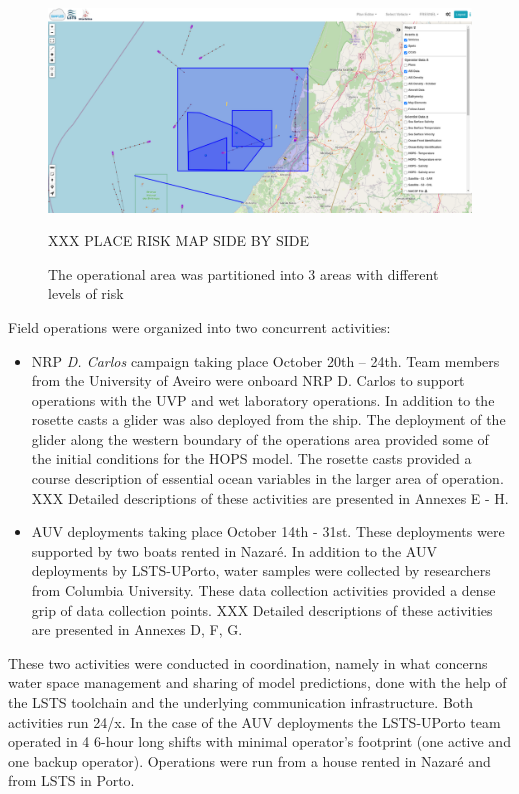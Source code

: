 \begin{figure}
    \centering
    \includegraphics[width=.7\linewidth]{fig/riskareas.png}
    \caption{The operational area was partitioned into 3 areas with
      different levels of risk} XXX PLACE RISK MAP SIDE BY SIDE
    \label{fig:riskareas}
\end{figure}

Field operations were organized into two concurrent activities:

\begin{itemize}
\item NRP \emph{D. Carlos} campaign taking place October 20th – 24th.
  Team members from the University of Aveiro were onboard NRP D. Carlos
  to support operations with the UVP and wet laboratory operations. In
  addition to the rosette casts a glider was also deployed from the
  ship. The deployment of the glider along the western boundary of the
  operations area provided some of the initial conditions for the HOPS
  model. The rosette casts provided a course description of essential
  ocean variables in the larger area of operation. XXX Detailed
  descriptions of these activities are presented in Annexes E - H.

\item AUV deployments taking place October 14th - 31st. These
  deployments were supported by two boats rented in Nazaré. In addition
  to the AUV deployments by LSTS-UPorto, water samples were collected by
  researchers from Columbia University. These data collection activities
  provided a dense grip of data collection points. XXX Detailed
  descriptions of these activities are presented in Annexes D, F, G.

\end{itemize}

These two activities were conducted in coordination, namely in what
concerns water space management and sharing of model predictions, done
with the help of the LSTS toolchain and the underlying communication
infrastructure. Both activities run 24/x. In the case of the AUV
deployments the LSTS-UPorto team operated in 4 6-hour long shifts with
minimal operator’s footprint (one active and one backup operator).
Operations were run from a house rented in Nazaré and from LSTS in
Porto.


